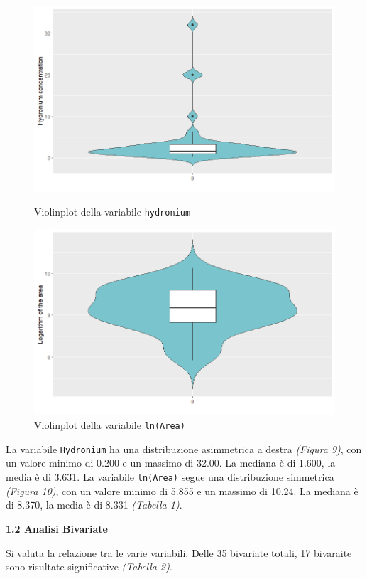 \documentclass{article} %
\begin{document}
\begin{figure}[H]
    \centering
    \begin{minipage}{0.49\textwidth}
        \centering
        \includegraphics[width=\textwidth]{immagini/vp_hy.png}
        \captionsetup{justification=centering}
        \caption{Violinplot della variabile \texttt{hydronium}}
    \end{minipage}
    \hfill
    \begin{minipage}{0.49\textwidth}
        \centering
        \includegraphics[width=\textwidth]{immagini/vp_ln.png}
        \captionsetup{justification=centering}
        \caption{Violinplot della variabile \texttt{ln(Area)}}
    \end{minipage}
\end{figure}
La variabile \texttt{Hydronium} ha una distribuzione asimmetrica a destra \textit{(Figura 9)}, con un valore minimo di 0.200 e un massimo di 32.00. La mediana è di 1.600, la media è di 3.631.
La variabile \texttt{ln(Area)} segue una distribuzione simmetrica \textit{(Figura 10)}, con un valore minimo di 5.855 e un massimo di 10.24. La mediana è di 8.370, la media è di 8.331 \textit{(Tabella 1)}.


\newpage
\begin{flushleft}
    
    \textbf{\Large 1.2 \: Analisi Bivariate}
    \vskip 10pt
\end{flushleft}
\vskip 10pt

Si valuta la relazione tra le varie variabili. Delle 35 bivariate totali, 17 bivaraite sono risultate significative \textit{(Tabella 2)}.\\
\end{document}
